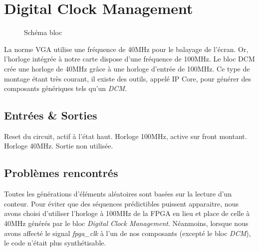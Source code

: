 \documentclass[french]{nakrule}
\begin{document}
\clearpage

\section{Digital Clock Management}
\label{sec:dcm}

\begin{figure}
\caption{Schéma bloc}
\label{dcmBloc}
\end{figure}

La norme VGA utilise une fréquence de 40MHz pour le balayage de l’écran. Or,
l’horloge intégrée à notre carte dispose d’une fréquence de 100MHz. Le bloc DCM
crée une horloge de 40MHz grâce à une horloge d'entrée de 100MHz.
Ce type de montage étant très courant, il existe des outils, appelé IP Core,
pour générer des composants génériques tels qu'un \emph{DCM}. 
\vspace{.4in}

\subsection{Entrées \& Sorties}
\label{subsec:Entrees_Sorties_dmc}

\begin{descr}
   Reset du circuit, actif à l'état haut.
   Horloge 100MHz, active sur front montant.
   Horloge 40MHz.
   Sortie non utilisée.
\end{descr}


\subsection{Problèmes rencontrés}
\label{subsec:Problemes_rencontres_dcm}

Toutes les générations d'éléments aléatoires sont basées sur la lecture d’un
conteur. Pour éviter que des séquences prédictibles puissent apparaitre, nous
avons choisi d'utiliser l'horloge à 100MHz de la FPGA en lieu et place de celle
à 40MHz générés par le bloc \emph{Digital Clock Management}. Néanmoins, lorsque
nous avons affecté le signal \emph{fpga\_clk} à l'un de nos composants (excepté
le bloc \emph{DCM}), le code n'était plus synthétisable.
\end{document}
